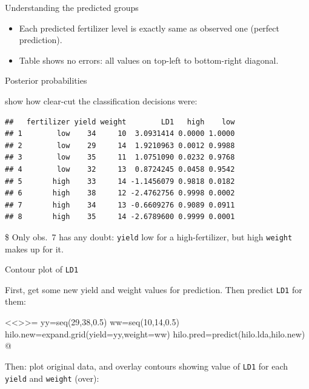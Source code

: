 \documentclass[ignorenonframetext,]{beamer}
\newenvironment{Shaded}{\begin{snugshade}}{\end{snugshade}}
\newcommand{\DecValTok}[1]{\textcolor[rgb]{0.00,0.00,0.81}{#1}}
\newcommand{\KeywordTok}[1]{\textcolor[rgb]{0.13,0.29,0.53}{\textbf{#1}}}
\newcommand{\NormalTok}[1]{#1}
\newcommand{\OperatorTok}[1]{\textcolor[rgb]{0.81,0.36,0.00}{\textbf{#1}}}
\newcommand{\StringTok}[1]{\textcolor[rgb]{0.31,0.60,0.02}{#1}}
\begin{document}
\begin{frame}{Understanding the predicted groups}
\protect\hypertarget{understanding-the-predicted-groups}{}

\begin{itemize}
\item
  Each predicted fertilizer level is exactly same as observed one
  (perfect prediction).
\item
  Table shows no errors: all values on top-left to bottom-right
  diagonal.
\end{itemize}

\end{frame}

\begin{frame}[fragile]{Posterior probabilities}
\protect\hypertarget{posterior-probabilities}{}

show how clear-cut the classification decisions were:

\begin{Shaded}
\end{Shaded}

\begin{verbatim}
##   fertilizer yield weight        LD1   high    low
## 1        low    34     10  3.0931414 0.0000 1.0000
## 2        low    29     14  1.9210963 0.0012 0.9988
## 3        low    35     11  1.0751090 0.0232 0.9768
## 4        low    32     13  0.8724245 0.0458 0.9542
## 5       high    33     14 -1.1456079 0.9818 0.0182
## 6       high    38     12 -2.4762756 0.9998 0.0002
## 7       high    34     13 -0.6609276 0.9089 0.0911
## 8       high    35     14 -2.6789600 0.9999 0.0001
\end{verbatim}

\$ Only obs.~7 has any doubt: \texttt{yield} low for a high-fertilizer,
but high \texttt{weight} makes up for it.

\end{frame}

\begin{frame}[fragile]{Contour plot of \texttt{LD1}}
\protect\hypertarget{contour-plot-of-ld1}{}

First, get some new yield and weight values for prediction. Then predict
\texttt{LD1} for them:

\textless{}\textless{}\textgreater{}\textgreater{}= yy=seq(29,38,0.5)
ww=seq(10,14,0.5) hilo.new=expand.grid(yield=yy,weight=ww)
hilo.pred=predict(hilo.lda,hilo.new) @

Then: plot original data, and overlay contours showing value of
\texttt{LD1} for each \texttt{yield} and \texttt{weight} (over):

\end{frame}
\end{document}
